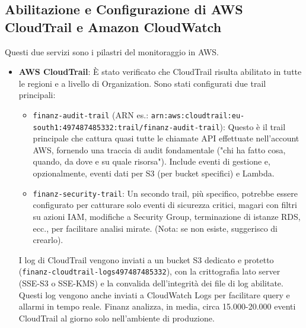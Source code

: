 \subsection{Abilitazione e Configurazione di AWS CloudTrail e Amazon CloudWatch}
\label{subsec:cloudtrail-cloudwatch-enable_cap2}
Questi due servizi sono i pilastri del monitoraggio in AWS.
\begin{itemize}
    \item \textbf{AWS CloudTrail}: È stato verificato che CloudTrail risulta abilitato in tutte le regioni e a livello di Organization.  Sono stati configurati due trail principali:
    \begin{itemize}
        \item \texttt{finanz-audit-trail} (ARN es.: \texttt{arn:aws:cloudtrail:\allowbreak{}eu-south\discretionary{-}{}{-}1:\allowbreak{}497487485332:\allowbreak{}trail/\allowbreak{}finanz-audit-trail}): Questo è il trail principale che cattura quasi tutte le chiamate API effettuate nell'account AWS, fornendo una traccia di audit fondamentale ("chi ha fatto cosa, quando, da dove e su quale risorsa"). Include eventi di gestione e, opzionalmente, eventi dati per S3 (per bucket specifici) e Lambda.
        \item \texttt{finanz-security-trail}: Un secondo trail, più specifico, potrebbe essere configurato per catturare solo eventi di sicurezza critici, magari con filtri su azioni IAM, modifiche a Security Group, terminazione di istanze RDS, ecc., per facilitare analisi mirate. (Nota: se non esiste, suggerisco di crearlo).
    \end{itemize}
    I log di CloudTrail vengono inviati a un bucket S3 dedicato e protetto (\texttt{finanz-cloudtrail-logs\discretionary{-}{}{-}497487485332}), con la crittografia lato server (SSE-S3 o SSE-KMS) e la convalida dell'integrità dei file di log abilitate. Questi log vengono anche inviati a CloudWatch Logs per facilitare query e allarmi in tempo reale. Finanz analizza, in media, circa 15.000-20.000 eventi CloudTrail al giorno solo nell'ambiente di produzione.


\end{itemize}
